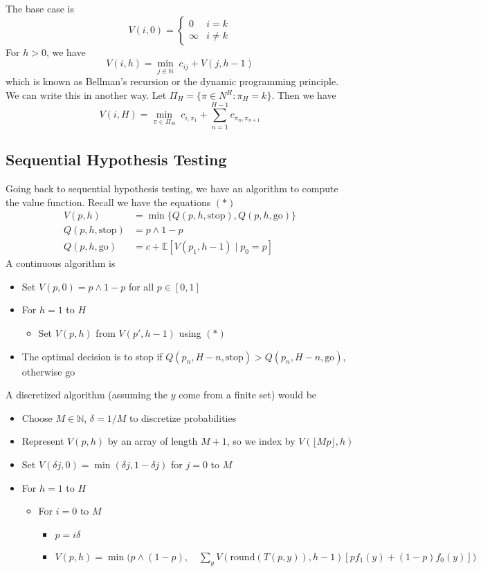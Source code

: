 \documentclass[pdftex,letterpaper,11pt]{article}
\theoremstyle{definition}
\theoremstyle{definition}
\theoremstyle{definition}
\newcommand{\NN}{\mathbb N}
\newcommand{\EE}{\mathbb E}
\newcommand{\mrm}[1]{\mathrm{#1}}
\begin{document}
The base case is
\[V(i,0) = \begin{cases}
	0 & i=k\\
	\infty & i \neq k
\end{cases}\]
For $h > 0$, we have
\[V(i, h) = \min_{j \in \NN}\; c_{ij} + V(j, h-1)\]
which is known as Bellman's recursion or the dynamic programming principle. We can write this in another way. Let $\Pi_H = \{\pi \in N^H : \pi_H = k\}$. Then we have
\[V(i,H) = \min_{\pi \in \Pi_H} \; c_{i, \pi_1} + \sum_{n=1}^{H-1} c_{\pi_n, \pi_{n+1}}\]

\subsection*{Sequential Hypothesis Testing}

Going back to sequential hypothesis testing, we have an algorithm to compute the value function. Recall we have the equations $(*)$
\begin{align*}
	V(p,h) & = \min\{Q(p,h,\mrm{stop}), Q(p,h,\mrm{go})\}\\
	Q(p,h,\mrm{stop}) & = p \wedge 1-p\\
	Q(p,h,\mrm{go}) & = c + \EE[V(p_1, h-1) \mid p_0 = p]
\end{align*}
A continuous algorithm is
\begin{itemize}
	\item[] Set $V(p, 0) = p \wedge 1-p$ for all $p \in [0,1]$
	\item[] For $h=1$ to $H$
		\begin{itemize}
			\item[] Set $V(p,h)$ from $V(p', h-1)$ using $(*)$
		\end{itemize}
	\item[] The optimal decision is to stop if $Q(p_n, H-n, \mrm{stop}) > Q(p_n, H-n, \mrm{go})$, otherwise $\mrm{go}$
\end{itemize}
A discretized algorithm (assuming the $y$ come from a finite set) would be
\begin{itemize}
	\item[] Choose $M \in \NN$, $\delta = 1/M$ to discretize probabilities
	\item[] Represent $V(p, h)$ by an array of length $M+1$, so we index by $V(\lfloor Mp \rfloor, h)$
	\item[] Set $V(\delta j, 0) = \min(\delta j, 1-\delta j)$ for $j=0$ to $M$
	\item[] For $h=1$ to $H$
		\begin{itemize}
			\item[] For $i=0$ to $M$
				\begin{itemize}
					\item[] $p=i\delta$
					\item[] $V(p,h) = \min\big(p \wedge (1-p),\quad \sum_y V(\mrm{round}(T(p,y)), h-1)[pf_1(y) + (1-p)f_0(y)] \big)$
				\end{itemize}
		\end{itemize}
\end{itemize}
\end{document}
